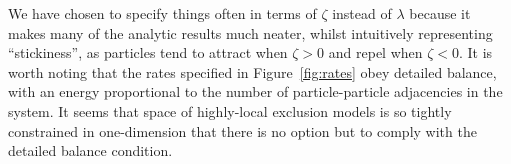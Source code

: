 We have chosen to specify things often in terms of $\zeta$ instead of $\lambda$ because it makes many of the analytic results much neater, whilst intuitively representing ``stickiness'', as
particles tend to attract when $\zeta>0$ and repel when $\zeta<0$. It is worth noting that the rates specified in Figure~\ref{fig:rates} obey detailed balance, with an energy proportional to the number of particle-particle adjacencies
in the system. It seems that space of highly-local exclusion models is so tightly constrained in one-dimension that there is no option but to comply with the detailed balance condition.


